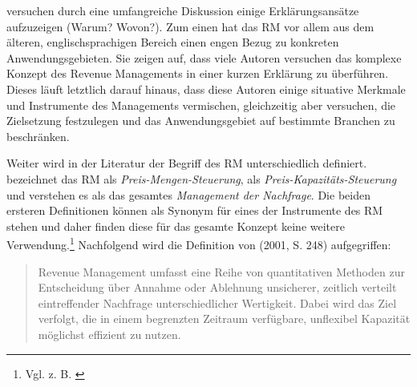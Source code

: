 \cite{kimms2005revenue} versuchen durch eine umfangreiche Diskussion einige Erklärungsansätze aufzuzeigen (Warum? Wovon?). Zum einen hat das RM vor allem aus dem älteren, englischsprachigen Bereich einen engen Bezug zu konkreten Anwendungsgebieten. Sie zeigen auf, dass viele Autoren versuchen das komplexe Konzept des Revenue Managements in einer kurzen Erklärung zu überführen. Dieses läuft letztlich darauf hinaus, dass diese Autoren einige situative Merkmale und Instrumente des Managements vermischen, gleichzeitig aber versuchen, die Zielsetzung festzulegen und das Anwendungsgebiet auf bestimmte Branchen zu beschränken. %

Weiter wird in der Literatur der Begriff des RM unterschiedlich definiert. \cite{friege1996yield} bezeichnet das RM als \textit{Preis-Mengen-Steuerung}, \cite{daudel1992yield} als \textit{Preis-Kapazitäts-Steuerung} und \cite{talluri2004theory} verstehen es als das gesamtes \textit{Management der Nachfrage}. Die beiden ersteren Definitionen können als Synonym für eines der Instrumente des RM stehen und daher finden diese für das gesamte Konzept keine weitere Verwendung.\footnote{Vgl. z. B. \cite{Petrick:2009aa}} Nachfolgend wird die Definition von \citeauthor{klein2001revenue} (2001, S. 248) aufgegriffen:

\begin{quote}
\glqq Revenue Management umfasst eine Reihe von quantitativen Methoden zur Entscheidung über Annahme oder Ablehnung unsicherer, zeitlich verteilt eintreffender Nachfrage unterschiedlicher Wertigkeit. Dabei wird das Ziel verfolgt, die in einem begrenzten Zeitraum verfügbare, unflexibel Kapazität möglichst effizient zu nutzen.\grqq
\end{quote}


